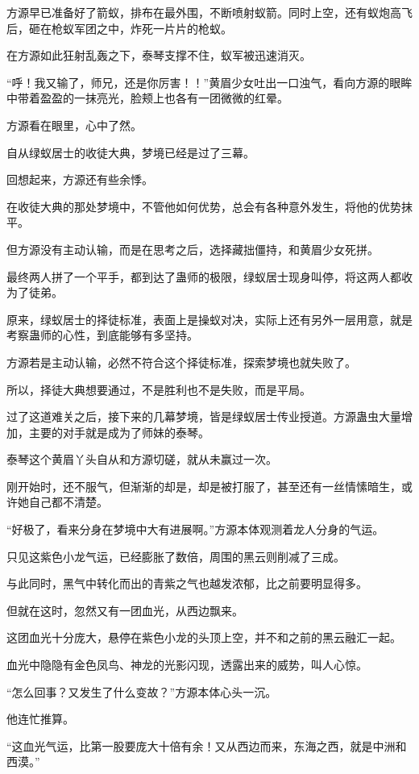 \begin{this_body}
方源早已准备好了箭蚁，排布在最外围，不断喷射蚁箭。同时上空，还有蚁炮高飞后，砸在枪蚁军团之中，炸死一片片的枪蚁。

在方源如此狂射乱轰之下，泰琴支撑不住，蚁军被迅速消灭。

“呼！我又输了，师兄，还是你厉害！！”黄眉少女吐出一口浊气，看向方源的眼眸中带着盈盈的一抹亮光，脸颊上也各有一团微微的红晕。

方源看在眼里，心中了然。

自从绿蚁居士的收徒大典，梦境已经是过了三幕。

回想起来，方源还有些余悸。

在收徒大典的那处梦境中，不管他如何优势，总会有各种意外发生，将他的优势抹平。

但方源没有主动认输，而是在思考之后，选择藏拙僵持，和黄眉少女死拼。

最终两人拼了一个平手，都到达了蛊师的极限，绿蚁居士现身叫停，将这两人都收为了徒弟。

原来，绿蚁居士的择徒标准，表面上是操蚁对决，实际上还有另外一层用意，就是考察蛊师的心性，到底能够有多坚持。

方源若是主动认输，必然不符合这个择徒标准，探索梦境也就失败了。

所以，择徒大典想要通过，不是胜利也不是失败，而是平局。

过了这道难关之后，接下来的几幕梦境，皆是绿蚁居士传业授道。方源蛊虫大量增加，主要的对手就是成为了师妹的泰琴。

泰琴这个黄眉丫头自从和方源切磋，就从未赢过一次。

刚开始时，还不服气，但渐渐的却是，却是被打服了，甚至还有一丝情愫暗生，或许她自己都不清楚。

“好极了，看来分身在梦境中大有进展啊。”方源本体观测着龙人分身的气运。

只见这紫色小龙气运，已经膨胀了数倍，周围的黑云则削减了三成。

与此同时，黑气中转化而出的青紫之气也越发浓郁，比之前要明显得多。

但就在这时，忽然又有一团血光，从西边飘来。

这团血光十分庞大，悬停在紫色小龙的头顶上空，并不和之前的黑云融汇一起。

血光中隐隐有金色凤鸟、神龙的光影闪现，透露出来的威势，叫人心惊。

“怎么回事？又发生了什么变故？”方源本体心头一沉。

他连忙推算。

“这血光气运，比第一股要庞大十倍有余！又从西边而来，东海之西，就是中洲和西漠。”


\end{this_body}
